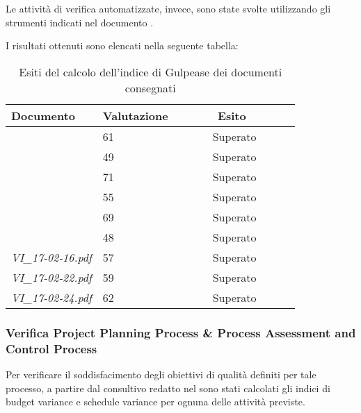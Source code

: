 		Le attività di verifica automatizzate, invece, sono state svolte utilizzando gli strumenti indicati nel documento \NdP. 
		
		I risultati ottenuti sono elencati nella seguente tabella:
		\begin{table}[H]
		\begin{tabular}{|l|l|l|}
		\hline
		\textbf{Documento} 		&\textbf{Valutazione} &\textbf{~~~~~~Esito~~~~~~} \\
		\hline
		\PdQ 					&61		&~~~~~~Superato~~~~~~\\
		\NdP 					&49		&~~~~~~Superato~~~~~~\\
		\AdR 					&71		&~~~~~~Superato~~~~~~\\
		\PdP 					&55		&~~~~~~Superato~~~~~~\\
		\ST 					&69		&~~~~~~Superato~~~~~~\\	
		\Glossario 				&48		&~~~~~~Superato~~~~~~\\
		\textit{VI_17-02-16.pdf} 		&57		&~~~~~~Superato~~~~~~\\
		\textit{VI_17-02-22.pdf} 		&59		&~~~~~~Superato~~~~~~\\
		\textit{VI_17-02-24.pdf} 		&62		&~~~~~~Superato~~~~~~\\
		\hline
		\end{tabular}
		\caption{Esiti del calcolo dell'indice di Gulpease dei documenti consegnati}
		\end{table}
		
		\subsubsection{Verifica Project Planning Process \& Process Assessment and Control Process}
		Per verificare il soddisfacimento degli obiettivi di qualità definiti per tale processo, a partire dal consultivo redatto nel \PdP{} sono stati calcolati gli indici di budget variance e schedule variance per ognuna delle attività previste.
		
